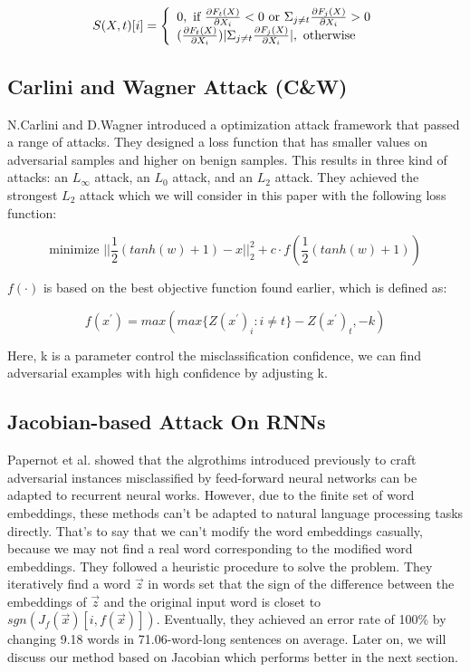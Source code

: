 \documentclass{article}
\begin{document}
\begin{equation}
  S(X,t)[i]=
  \left\{
  \begin{array}{rcl}
    0, \mbox{ if } \frac{\partial F_t(X)}{\partial X_i}<0 \mbox{ or } \Sigma_{j\neq t} \frac{\partial F_j(X)}{\partial X_i}>0 \hfill \\
    (\frac{\partial F_t(X)}{\partial X_i})|\Sigma_{j\neq t} \frac{\partial F_j(X)}{\partial X_i}|, \mbox{ otherwise}          \hfill
  \end{array}
  \right.
  \label{jsma}
\end{equation}

\subsection{Carlini and Wagner Attack (C\&W)}

N.Carlini and D.Wagner introduced a optimization attack framework \cite{carlini2017adversarial} that passed a range of attacks. They designed a loss function that has smaller values on adversarial samples and higher on benign samples. This results in three kind of attacks: an $L_\infty$ attack, an $L_0$ attack, and an $L_2$ attack. They achieved the strongest $L_2$ attack which we will consider in this paper with the following loss function:

\begin{equation}
  \mbox{minimize } ||\frac{1}{2}(tanh(w)+1)-x||_2^2+c\cdot f(\frac{1}{2}(tanh(w)+1))
\end{equation}

$f(\cdot)$ is based on the best objective function found earlier, which is defined as:

\begin{equation}
  f(x^{'})=max(max\{Z(x^{'})_i:i\neq t\}-Z(x^{'})_t,-k)
\end{equation}

Here, k is a parameter control the misclassification confidence, we can find adversarial examples with high confidence by adjusting k.

\subsection{Jacobian-based Attack On RNNs}

Papernot et al. \cite{papernot2016crafting} showed that the algrothims introduced previously to craft adversarial instances misclassified by feed-forward neural networks can be adapted to recurrent neural works. However, due to the finite set of word embeddings, these methods can't be adapted to natural language processing tasks directly. That's to say that we can't modify the word embeddings casually, because we may not find a real word corresponding to the modified word embeddings. They followed a heuristic procedure to solve the problem. They iteratively find a word $\vec{z}$ in words set that the sign of the difference between the embeddings of $\vec{z}$ and the original input word is closet to $sgn(J_f(\vec{x})[i,f(\vec{x})])$. Eventually, they achieved an error rate of 100\% by changing 9.18 words in 71.06-word-long sentences on average. Later on, we will discuss our method based on Jacobian which performs better in the next section.
\end{document}
